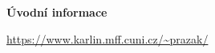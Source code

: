 %
{}
\begin{center}
{\bfseries\Large Úvodní informace}\par\vspace{1em}
\end{center}

\url{https://www.karlin.mff.cuni.cz/~prazak/}

